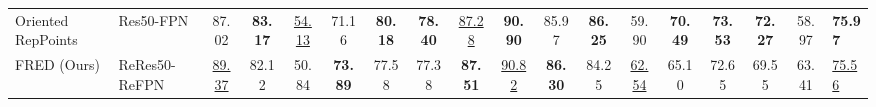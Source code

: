 \begin{center}
{\begin{tabular}{llccccccccccccccc|g}
Oriented RepPoints\citep{li2022oriented}    & Res50-FPN     & 87.02     & {\textbf{83.17}}     & {\underline{54.13}}     & 71.16     & {\textbf{80.18}}     & {\textbf{78.40}}     & {\underline{87.28}}     & {\textbf{90.90}}     & 85.97     & {\textbf{86.25}}     & 59.90     & {\textbf{70.49}}     & {\textbf{73.53}}     & {\textbf{72.27}}     & 58.97     & {\textbf{75.97}} \\
FRED (Ours)                                        & ReRes50-ReFPN & {\underline{89.37}}     & 82.12     & 50.84     & {\textbf{73.89}}     & 77.58     & 77.38     & {\textbf{87.51}}     & {\underline{90.82}}     & {\textbf{86.30}}     & 84.25     & {\underline{62.54}}     & 65.10     & 72.65     & 69.55     & 63.41     & {\underline{75.56}} \\
\bottomrule
\end{tabular}%
}
\end{center}
